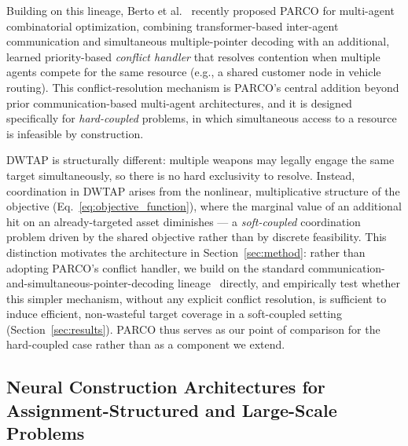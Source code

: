 \documentclass{ieeeaccess}
\begin{document}
Building on this lineage, Berto et al.~\cite{parco2024} recently proposed PARCO for multi-agent combinatorial optimization, combining transformer-based inter-agent communication and simultaneous multiple-pointer decoding with an additional, learned priority-based \emph{conflict handler} that resolves contention when multiple agents compete for the same resource (e.g., a shared customer node in vehicle routing). This conflict-resolution mechanism is PARCO's central addition beyond prior communication-based multi-agent architectures, and it is designed specifically for \emph{hard-coupled} problems, in which simultaneous access to a resource is infeasible by construction.

DWTAP is structurally different: multiple weapons may legally engage the same target simultaneously, so there is no hard exclusivity to resolve. Instead, coordination in DWTAP arises from the nonlinear, multiplicative structure of the objective (Eq.~\eqref{eq:objective_function}), where the marginal value of an additional hit on an already-targeted asset diminishes — a \emph{soft-coupled} coordination problem driven by the shared objective rather than by discrete feasibility. This distinction motivates the architecture in Section~\ref{sec:method}: rather than adopting PARCO's conflict handler, we build on the standard communication-and-simultaneous-pointer-decoding lineage~\cite{sukhbaatar2016commnet,das2019tarmac,vinyals2015pointer} directly, and empirically test whether this simpler mechanism, without any explicit conflict resolution, is sufficient to induce efficient, non-wasteful target coverage in a soft-coupled setting (Section~\ref{sec:results}). PARCO thus serves as our point of comparison for the hard-coupled case rather than as a component we extend.

\subsection{Neural Construction Architectures for Assignment-Structured and Large-Scale Problems}
\end{document}
